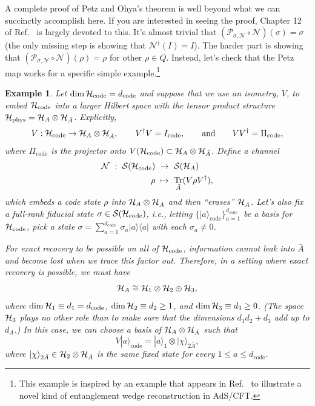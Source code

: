 \documentclass[a4paper,11pt]{article}
\newtheorem{example}[thm]{Example}
\newenvironment{eg}{\begin{example}  \rm  }{    \end{example} }
\renewcommand{\Ref}[1]{Ref.~\cite{#1}}
\DeclareMathOperator{\Tr}{Tr}
\newcommand{\ket}[1]{|#1\rangle}
\newcommand{\ketbra}[2]{| #1 \rangle \langle #2 |}
\newcommand{\Hil}{{\cal H}}
\newcommand{\mrm}[1]{\mathrm{#1}}
\begin{document}
A complete proof of Petz and Ohya's theorem is well beyond what we can succinctly accomplish here.
If you are interested in seeing the proof, Chapter 12 of \Ref{Wilde:2011npi} is largely devoted to this.
It's almost trivial that $(\mathcal{P}_{\mathcal{\sigma},\mathcal{N}} \circ \mathcal{N})(\sigma) = \sigma$ (the only missing step is showing that $\mathcal{N}^\dagger(I) = I$).
The harder part is showing that $(\mathcal{P}_{\mathcal{\sigma},\mathcal{N}} \circ \mathcal{N})(\rho) = \rho$ for other $\rho \in Q$.
Instead, let's check that the Petz map works for a specific simple example.\footnote{This example is inspired by an example that appears in \Ref{Penington:2019kki} to illustrate a novel kind of entanglement wedge reconstruction in AdS/CFT.}

\begin{eg} \label{eg:Petz}
Let $\dim \Hil_\mrm{code} = d_\mrm{code}$ and suppose that we use an isometry, $V$, to embed $\Hil_\mrm{code}$ into a larger Hilbert space with the tensor product structure $\Hil_\mrm{phys} = \Hil_A \otimes \Hil_{\bar{A}}$.
Explicitly,
\begin{equation}
V : \Hil_\mrm{code} \rightarrow \Hil_A \otimes \Hil_{\bar{A}}, \qquad V^\dagger V = I_\mrm{code}, \qquad \text{and} \qquad VV^\dagger = \Pi_\mrm{code},
\end{equation}
where $\Pi_\mrm{code}$ is the projector onto $V(\Hil_\mrm{code}) \subset\Hil_A \otimes \Hil_{\bar{A}}$.
Define a channel
\begin{equation}
\begin{aligned}
\mathcal{N} ~ : ~ \mathcal{S}(\Hil_\mrm{code}) ~ &\rightarrow ~ \mathcal{S}(\Hil_A) \\
 \rho ~ &\mapsto ~ \Tr_{\bar{A}}(V \rho V^\dagger),
\end{aligned}
\end{equation}
which embeds a code state $\rho$ into $\Hil_A \otimes \Hil_{\bar{A}}$ and then ``erases'' $\Hil_{\bar{A}}$.
Let's also fix a full-rank fiducial state $\sigma \in \mathcal{S}(\Hil_\mrm{code})$, i.e., letting $\{\ket{a}_\mrm{code}\}_{a=1}^{d_\mrm{code}}$ be a basis for $\Hil_\mrm{code}$, pick a state $\sigma = \sum_{a=1}^{d_\mrm{code}} \sigma_a \ketbra{a}{a}$ with each $\sigma_a \neq 0$.

For exact recovery to be possible on all of $\Hil_\mrm{code}$, information cannot leak into $\bar{A}$ and become lost when we trace this factor out.
Therefore, in a setting where exact recovery is possible, we must have
\begin{equation}
\Hil_A \cong \Hil_1 \otimes \Hil_2 \oplus \Hil_3,
\end{equation}
where $\dim \Hil_1 \equiv d_1 = d_\mrm{code}$, $\dim \Hil_2 \equiv d_2 \geq 1$, and $\dim \Hil_3 \equiv d_3 \geq 0$.
(The space $\Hil_3$ plays no other role than to make sure that the dimensions $d_1 d_2 + d_3$ add up to $d_A$.)
In this case, we can choose a basis of $\Hil_A \otimes \Hil_{\bar A}$ such that
\begin{equation}
V \ket{a}_\mrm{code} = \ket{a}_1 \otimes \ket{\chi}_{2\bar{A}},
\end{equation}
where $\ket{\chi}_{2\bar{A}} \in \Hil_2 \otimes \Hil_{\bar{A}}$ is the same fixed state for every $1 \leq a \leq d_\mrm{code}$.


\end{eg}
\end{document}
